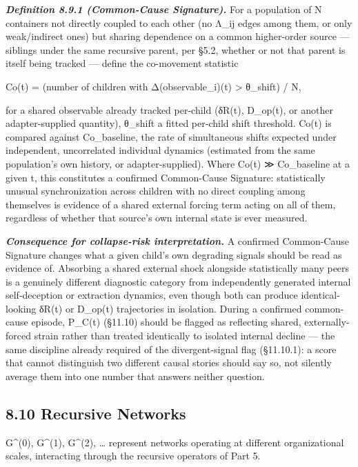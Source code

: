 \documentclass[
]{article}
\begin{document}
\emph{\textbf{Definition 8.9.1 (Common-Cause Signature).}} For a
population of N containers not directly coupled to each other (no Λ\_ij
edges among them, or only weak/indirect ones) but sharing dependence on
a common higher-order source --- siblings under the same recursive
parent, per §5.2, whether or not that parent is itself being tracked ---
define the co-movement statistic

Co(t) = (number of children with \textbar Δ(observable\_i)(t)\textbar{}
\textgreater{} θ\_shift) / N,

for a shared observable already tracked per-child (δR(t), D\_op(t), or
another adapter-supplied quantity), θ\_shift a fitted per-child shift
threshold. Co(t) is compared against Co\_baseline, the rate of
simultaneous shifts expected under independent, uncorrelated individual
dynamics (estimated from the same population's own history, or
adapter-supplied). Where Co(t) ≫ Co\_baseline at a given t, this
constitutes a confirmed Common-Cause Signature: statistically unusual
synchronization across children with no direct coupling among themselves
is evidence of a shared external forcing term acting on all of them,
regardless of whether that source's own internal state is ever measured.

\emph{\textbf{Consequence for collapse-risk interpretation.}} A
confirmed Common-Cause Signature changes what a given child's own
degrading signals should be read as evidence of. Absorbing a shared
external shock alongside statistically many peers is a genuinely
different diagnostic category from independently generated internal
self-deception or extraction dynamics, even though both can produce
identical-looking δR(t) or D\_op(t) trajectories in isolation. During a
confirmed common-cause episode, P\_C(t) (§11.10) should be flagged as
reflecting shared, externally-forced strain rather than treated
identically to isolated internal decline --- the same discipline already
required of the divergent-signal flag (§11.10.1): a score that cannot
distinguish two different causal stories should say so, not silently
average them into one number that answers neither question.

\hypertarget{recursive-networks}{%
\subsection{8.10 Recursive Networks}\label{recursive-networks}}

G\^{}(0), G\^{}(1), G\^{}(2), \ldots{} represent networks operating at
different organizational scales, interacting through the recursive
operators of Part 5.
\end{document}
